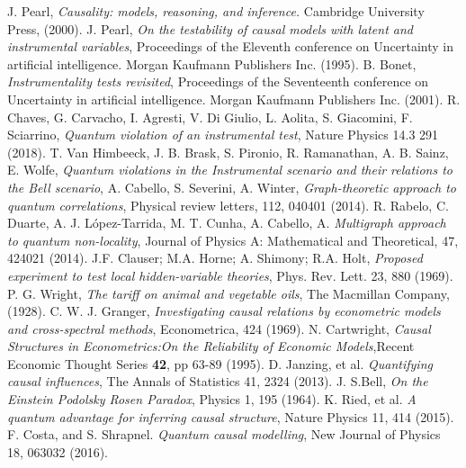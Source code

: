 \documentclass[letterpaper]{article}
\begin{document}
\begin{thebibliography}{}
     J. Pearl, 
        {\em Causality: models, reasoning, and inference.}
        Cambridge University Press, (2000).
     J. Pearl, 
        {\em On the testability of causal models with latent and instrumental variables}, 
        Proceedings of the Eleventh conference on Uncertainty in artificial
        intelligence. Morgan Kaufmann Publishers Inc. (1995).
     B. Bonet, {\em Instrumentality tests revisited},
        Proceedings of the Seventeenth conference on Uncertainty in artificial
        intelligence. Morgan Kaufmann Publishers Inc. (2001).
     R. Chaves, G. Carvacho, I. Agresti, V. Di Giulio, L. Aolita,
        S. Giacomini, F. Sciarrino, 
        {\em Quantum violation of an instrumental test}, 
        Nature Physics 14.3 291 (2018).
      T. Van Himbeeck, J. B. Brask, S. Pironio, R. Ramanathan, A. B. Sainz, E. Wolfe, 
        {\em Quantum violations in the Instrumental scenario and their relations to the Bell scenario},
      A. Cabello, S. Severini, A. Winter,
         {\em Graph-theoretic approach to quantum correlations}, 
         Physical review letters, 112, 040401 (2014).
      R. Rabelo, C. Duarte, A. J.  López-Tarrida, M. T. Cunha, A. Cabello, A. 
         {\em Multigraph approach to quantum non-locality},
         Journal of Physics A: Mathematical and Theoretical, 47, 424021
         (2014).
       J.F. Clauser; M.A. Horne; A. Shimony; R.A. Holt, {\em Proposed experiment to test local hidden-variable theories}, Phys. Rev. Lett. 23, 880 (1969).
     P. G. Wright, \emph{The tariff on animal and vegetable oils}, The Macmillan Company, (1928).
     C. W. J. Granger, \emph{Investigating causal relations by econometric models and cross-spectral methods}, Econometrica, 424 (1969).
     N. Cartwright, \emph{Causal Structures in Econometrics:On the Reliability of Economic Models},Recent Economic Thought Series \textbf{42}, pp 63-89 (1995).
          D. Janzing, et al. {\em Quantifying causal influences}, The Annals of Statistics 41, 2324 (2013).
      J. S.Bell, {\em On the Einstein Podolsky Rosen Paradox}, Physics 1, 195 (1964).
     K. Ried, et al. {\em A quantum advantage for inferring causal structure}, Nature Physics 11, 414 (2015).
       F. Costa, and S. Shrapnel. {\em Quantum causal modelling}, New Journal of Physics 18, 063032 (2016).

\end{thebibliography}
\end{document}

